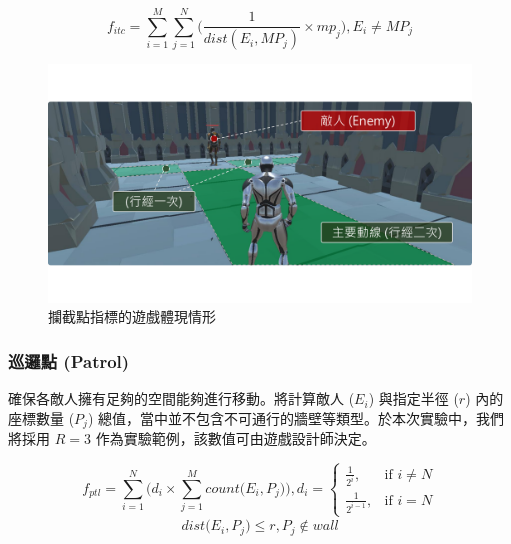\begin{equation}
    \label{eq:fitnesses-intercept}
    f_{itc} = \sum_{i=1}^{M} \sum_{j=1}^{N} \Big( \frac{1}{dist(E_{i}, MP_{j})} \times mp_{j} \Big), 
    E_{i} \neq MP_{j}
\end{equation}

\begin{figure}[!htb]
  \begin{center}
    \includegraphics[width=1.0\textwidth]{figures/fitnesses-intercept-gameplay.pdf}
    \caption{攔截點指標的遊戲體現情形}
    \label{fig:fitnesses-intercept-gameplay}
  \end{center}
\end{figure}

\subsubsection{巡邏點 (Patrol)}
\label{sssec:method-segments-fitnesses-patrol}

確保各敵人擁有足夠的空間能夠進行移動。將計算敵人 ($E_{i}$) 與指定半徑 ($r$) 內的座標數量 ($P_j$) 總值，當中並不包含不可通行的牆壁等類型。於本次實驗中，我們將採用 $R=3$ 作為實驗範例，該數值可由遊戲設計師決定。

\begin{equation}
    f_{ptl} = \sum_{i=1}^{N} \Big( d_{i} \times \sum_{j=1}^{M} count\big(E_{i}, P_{j}\big) \Big), 
    d_{i} = \begin{cases}
                \frac{1}{2^{i}},   & \mbox{if } i \neq N \\
                \frac{1}{2^{i-1}}, & \mbox{if } i = N
            \end{cases}
\end{equation}
\begin{gather*}
    dist\big(E_{i}, P_{j}\big) \leq r,  P_{j} \notin wall
\end{gather*}

